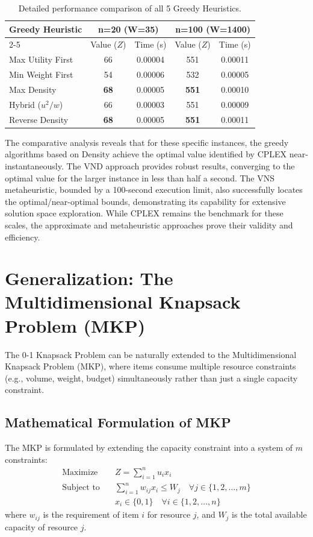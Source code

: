 \documentclass[11pt,a4paper]{article}
\begin{document}
\begin{table}[htbp]
    \centering
    \small
    \begin{tabular}{|l|cc|cc|}
        \hline
        \multirow{2}{*}{\textbf{Greedy Heuristic}} & \multicolumn{2}{c|}{\textbf{n=20 (W=35)}} & \multicolumn{2}{c|}{\textbf{n=100 (W=1400)}} \\
        \cline{2-5}
        & Value ($Z$) & Time (s) & Value ($Z$) & Time (s) \\
        \hline
        Max Utility First & 66 & 0.00004 & 551 & 0.00011 \\
        Min Weight First  & 54 & 0.00006 & 532 & 0.00005 \\
        Max Density       & \textbf{68} & 0.00005 & \textbf{551} & 0.00010 \\
        Hybrid ($u^2/w$)  & 66 & 0.00003 & 551 & 0.00009 \\
        Reverse Density   & \textbf{68} & 0.00005 & \textbf{551} & 0.00011 \\
        \hline
    \end{tabular}
    \caption{Detailed performance comparison of all 5 Greedy Heuristics.}
    \label{tab:greedy_results}
\end{table}

The comparative analysis reveals that for these specific instances, the greedy algorithms based on Density achieve the optimal value identified by CPLEX near-instantaneously. The VND approach provides robust results, converging to the optimal value for the larger instance in less than half a second. The VNS metaheuristic, bounded by a 100-second execution limit, also successfully locates the optimal/near-optimal bounds, demonstrating its capability for extensive solution space exploration. While CPLEX remains the benchmark for these scales, the approximate and metaheuristic approaches prove their validity and efficiency.

\section{Generalization: The Multidimensional Knapsack Problem (MKP)}
The 0-1 Knapsack Problem can be naturally extended to the Multidimensional Knapsack Problem (MKP), where items consume multiple resource constraints (e.g., volume, weight, budget) simultaneously rather than just a single capacity constraint.

\subsection{Mathematical Formulation of MKP}
The MKP is formulated by extending the capacity constraint into a system of $m$ constraints:
\begin{align*}
\text{Maximize} \quad & Z = \sum_{i=1}^{n} u_i x_i \\
\text{Subject to} \quad & \sum_{i=1}^{n} w_{ij} x_i \leq W_j \quad \forall j \in \{1, 2, \dots, m\} \\
& x_i \in \{0, 1\} \quad \forall i \in \{1, 2, \dots, n\}
\end{align*}
where $w_{ij}$ is the requirement of item $i$ for resource $j$, and $W_j$ is the total available capacity of resource $j$.
\end{document}
